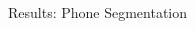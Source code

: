 \documentclass[final]{beamer}
\newcommand{\nonparallel}[1]{\textcolor{tablue20orange}{#1}}
\newcommand{\zeroshot}[1]{\textcolor{tablue20blue}{#1}}
\newcommand{\mytable}{
    \centering
    \small
    \renewcommand{\arraystretch}{1.2}
    }
\newcommand{\ubold}{\fontseries{b}\selectfont}  %
\newcommand{\mybf}[1]{\textcolor{darkestgray}{\textbf{#1}}}
\begin{document}
\begin{frame}[t]
\begin{columns}[T]
\begin{column}{.33\linewidth}
\begin{minipage}[T]{.97\textwidth}
{\begin{block}{Results: Phone Segmentation}

        

\end{block}}
\end{minipage}
\end{column}
\end{columns}
\end{frame}
\end{document}
